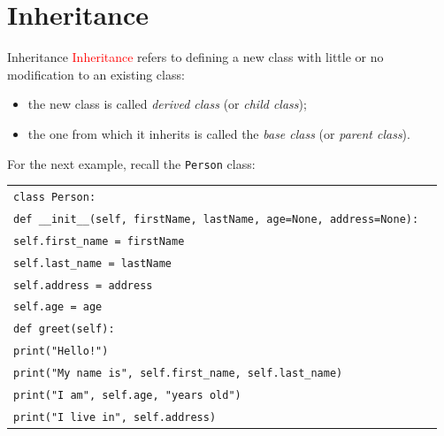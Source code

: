 \documentclass[t,handout,9pt]{beamer}
\begin{document}
\section{Inheritance}
\begin{frame}{Inheritance}
\vfill
\textcolor{red}{Inheritance} refers to defining a new class with little or no modification to an existing class:
\begin{itemize}
	\item the new class is called \textit{derived class} (or \textit{child class});
	\item the one from which it inherits is called the \textit{base class} (or \textit{parent class}).
\end{itemize}
\vfill
\vspace{2mm}
For the next example, recall the \texttt{Person} class:
\vspace{-3mm}
\begin{table}[]
\begin{flushleft}
\begin{tabular}{ll}
\texttt{class Person:} &  \\
\texttt{\qquad def \_\_init\_\_(self, firstName, lastName, age=None, address=None):} &  \\
\texttt{\qquad\qquad self.first\_name = firstName} &  \\
\texttt{\qquad\qquad self.last\_name = lastName} &  \\
\texttt{\qquad\qquad self.address = address} &  \\
\texttt{\qquad\qquad self.age = age} &  \\
\texttt{\qquad def greet(self):} &  \\
\texttt{\qquad\qquad print("Hello!")} &  \\
\texttt{\qquad\qquad print("My name is", self.first\_name, self.last\_name)} &  \\
\texttt{\qquad\qquad print("I am", self.age, "years old")} &  \\
\texttt{\qquad\qquad print("I live in", self.address)} &  \\
\end{tabular}
\end{flushleft}
\end{table}
\vfill
\end{frame}
%
\end{document}
